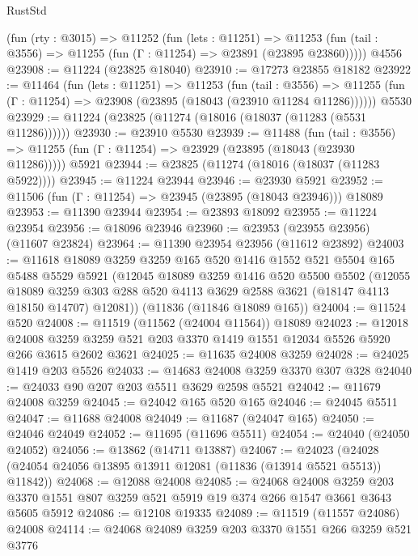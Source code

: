 \begin{lexlean}{RustStd}
\begin{coremodule}
    (fun (rty : @3015) =>
    @11252
      (fun (lets : @11251) =>
      @11253 (fun (tail : @3556) => @11255 (fun (Γ : @11254) => @23891 (@23895 @23860)))))
    @4556
@23908 := @11224 (@23825 @18040)
@23910 := @17273 @23855 @18182
@23922 := @11464
    (fun (lets : @11251) =>
    @11253
      (fun (tail : @3556) =>
      @11255 (fun (Γ : @11254) => @23908 (@23895 (@18043 (@23910 @11284 @11286))))))
    @5530
@23929 := @11224 (@23825 (@11274 (@18016 (@18037 (@11283 (@5531 @11286))))))
@23930 := @23910 @5530
@23939 := @11488
    (fun (tail : @3556) => @11255 (fun (Γ : @11254) => @23929 (@23895 (@18043 (@23930 @11286)))))
    @5921
@23944 := @23825 (@11274 (@18016 (@18037 (@11283 @5922))))
@23945 := @11224 @23944
@23946 := @23930 @5921
@23952 := @11506 (fun (Γ : @11254) => @23945 (@23895 (@18043 @23946))) @18089
@23953 := @11390 @23944
@23954 := @23893 @18092
@23955 := @11224 @23954
@23956 := @18096 @23946
@23960 := @23953 (@23955 @23956) (@11607 @23824)
@23964 := @11390 @23954 @23956 (@11612 @23892)
@24003 := @11618
    @18089
    @3259
    @3259
    @165
    @520
    @1416
    @1552
    @521
    @5504
    @165
    @5488
    @5529
    @5921
    (@12045
      @18089
      @3259
      @1416
      @520
      @5500
      @5502
      (@12055
        @18089
        @3259
        @303
        @288
        @520
        @4113
        @3629
        @2588
        @3621
        (@18147 @4113 @18150 @14707)
        @12081))
    (@11836 (@11846 @18089 @165))
@24004 := @11524 @520
@24008 := @11519 (@11562 (@24004 @11564)) @18089
@24023 := @12018
    @24008
    @3259
    @3259
    @521
    @203
    @3370
    @1419
    @1551
    @12034
    @5526
    @5920
    @266
    @3615
    @2602
    @3621
@24025 := @11635 @24008 @3259
@24028 := @24025 @1419 @203 @5526
@24033 := @14683 @24008 @3259 @3370 @307 @328
@24040 := @24033 @90 @207 @203 @5511 @3629 @2598 @5521
@24042 := @11679 @24008 @3259
@24045 := @24042 @165 @520 @165
@24046 := @24045 @5511
@24047 := @11688 @24008
@24049 := @11687 (@24047 @165)
@24050 := @24046 @24049
@24052 := @11695 (@11696 @5511)
@24054 := @24040 (@24050 @24052)
@24056 := @13862 (@14711 @13887)
@24067 := @24023 (@24028 (@24054 @24056 @13895 @13911 @12081 (@11836 (@13914 @5521 @5513)) @11842))
@24068 := @12088 @24008
@24085 := @24068
    @24008
    @3259
    @203
    @3370
    @1551
    @807
    @3259
    @521
    @5919
    @19
    @374
    @266
    @1547
    @3661
    @3643
    @5605
    @5912
@24086 := @12108 @19335
@24089 := @11519 (@11557 @24086) @24008
@24114 := @24068
    @24089
    @3259
    @203
    @3370
    @1551
    @266
    @3259
    @521
    @3776

\end{coremodule}
\end{lexlean}

